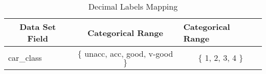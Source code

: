 \begin{table}[H]
\centering
\caption{Decimal Labels Mapping}
\begin{tabular}{l|c|l}
\hline
\multicolumn{1}{c|}{\textbf{Data Set Field}} & \textbf{Categorical Range} & \textbf{Categorical Range}     \\ \hline
car\_class                                   & $\lbrace$ unacc, acc, good, v-good $\rbrace$  & \multicolumn{1}{c}{ $\lbrace$ 1, 2, 3, 4 $\rbrace$ } \\ \hline
\end{tabular}
\end{table}
